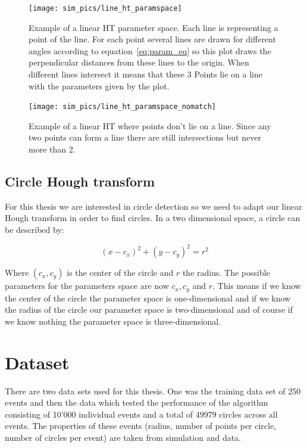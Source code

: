 \documentclass[11pt,twoside]{scrreprt}
\begin{document}
\begin{figure}[tb]
  \centering
  \texttt{[image: sim\_pics/line\_ht\_paramspace]}
  \caption[Example of a linear HT space]{Example of a linear HT parameter space. Each line is representing a point of the line. For each point several lines are drawn for different angles according to equation~\ref{eq:param_eq} so this plot draws the perpendicular distances from these lines to the origin. When different lines intersect it means that these 3 Points lie on a line with the parameters given by the plot.}
  \label{fig:line_ht}
\end{figure}

\begin{figure}[tb]
  \centering
  \texttt{[image: sim\_pics/line\_ht\_paramspace\_nomatch]}
  \caption[Example of a linear HT where points don't lie on a line]{Example of a linear HT where points don't lie on a line. Since any two points can form a line there are still intersections but never more than 2.}
  \label{fig:line_ht_nomatch}
\end{figure}

\subsection{Circle Hough transform} %
\label{sub:circle_hough_transform}

For this thesis we are interested in circle detection so we need to adapt our linear Hough transform in order to find circles. In a two dimensional space, a circle can be described by:

\begin{equation}
		(x-c_x)^2 + (y-c_y)^2 = r^2
\end{equation}

Where $(c_x,c_y)$ is the center of the circle and $r$ the radius. The possible parameters for the parameters space are now $c_x, c_y$ and $r$. This means if we know the center of the circle the parameter space is one-dimensional and if we know the radius of the circle our parameter space is two-dimensional and of course if we know nothing the parameter space is three-dimensional.




\section{Dataset} %
\label{sec:dataset}
There are two data sets used for this thesis. One was the training data set of 250 events and then the data which tested the performance of the algorithm consisting of 10'000
individual events and a total of 49979 circles across all events. The properties of these events (radius, number of points per circle, number of circles per event) are taken from simulation and data.
\end{document}

